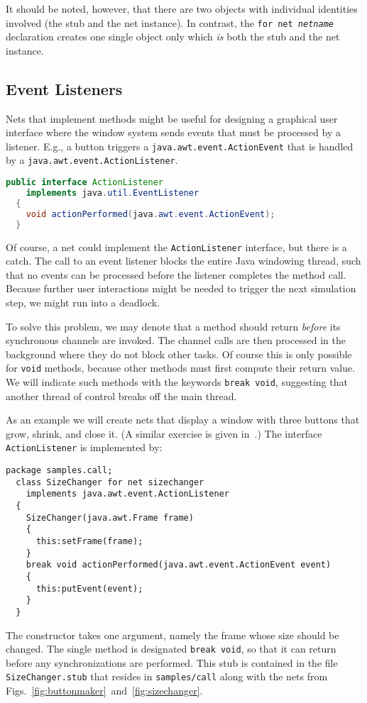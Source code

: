It should be noted, however, that there are two objects with individual
identities involved (the stub and the net instance).
In contrast, the \texttt{for net \emph{netname}} declaration creates one
single object only which \emph{is} both the stub and the net instance.

\subsection{Event Listeners}

Nets that implement methods might be useful for designing a graphical
user interface where the window system sends events that must be
processed by a listener. E.g., a button triggers
a \texttt{java.awt.event.ActionEvent} that is handled by a
\texttt{java.awt.event.ActionListener}.
\begin{lstlisting}[language = Java, style=xnonfloating]
  public interface ActionListener
    implements java.util.EventListener
  {
    void actionPerformed(java.awt.event.ActionEvent);
  }
\end{lstlisting}
Of course, a net could implement the \texttt{ActionListener}
interface, but there is a catch. The call to an event listener
blocks the entire Java windowing thread, such that no
events can be processed before the listener completes the method
call. Because further user interactions might be needed to
trigger the next simulation step, we might run into a deadlock.

To solve this problem, we may denote that a method should
return \emph{before} its synchronous channels are invoked.
The channel calls are then processed in the background where
they do not block other tasks. Of course this is only possible for
\texttt{void} methods, because other methods must first compute
their return value. We will indicate such methods with
the keywords \texttt{break void}, suggesting that another
thread of control breaks off the main thread.

As an example we will create nets that display a window with three
buttons that grow, shrink, and close it. (A similar exercise is
given in~\cite{vdLinden96}.) The interface \texttt{ActionListener}
is implemented by:
\begin{lstlisting}[style=xnonfloating]
  package samples.call;
  class SizeChanger for net sizechanger
    implements java.awt.event.ActionListener
  {
    SizeChanger(java.awt.Frame frame)
    {
      this:setFrame(frame);
    }
    break void actionPerformed(java.awt.event.ActionEvent event)
    {
      this:putEvent(event);
    }
  }
\end{lstlisting}
The constructor takes one argument, namely the frame whose size
should be changed. The single method is designated \texttt{break void},
so that it can return before any synchronizations are performed.
This stub is contained in the file \texttt{SizeChanger.stub} that
resides in \texttt{samples/call} along with the nets from
Figs.\ \ref{fig:buttonmaker}~and~\ref{fig:sizechanger}.

